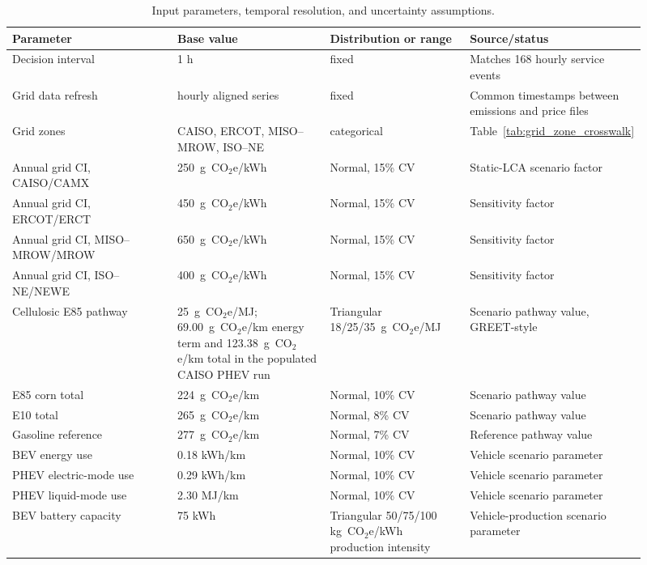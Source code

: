 \documentclass[cleantechnol,article,submit,pdftex,moreauthors]{Definitions/mdpi}
\newcommand{\gcoeqkm}{g~CO$_2$e/km}
\newcommand{\gcoeqkwh}{g~CO$_2$e/kWh}
\newcommand{\gcoeqmj}{g~CO$_2$e/MJ}
\begin{document}
\begin{table}[htbp]
	\centering
	\begin{threeparttable}
		\caption{Input parameters, temporal resolution, and uncertainty assumptions.}
		\label{tab:parameters}
		\scriptsize
		\begin{tabular}{p{0.26\linewidth}p{0.24\linewidth}p{0.22\linewidth}p{0.19\linewidth}}
			\toprule
			Parameter & Base value & Distribution or range & Source/status \\
			\midrule
			Decision interval & 1 h & fixed & Matches 168 hourly service events \\
			Grid data refresh & hourly aligned series & fixed & Common timestamps between emissions and price files \\
			Grid zones & CAISO, ERCOT, MISO--MROW, ISO--NE & categorical & Table~\ref{tab:grid_zone_crosswalk} \\
			Annual grid CI, CAISO/CAMX & 250~\gcoeqkwh{} & Normal, 15\% CV & Static-LCA scenario factor \\
			Annual grid CI, ERCOT/ERCT & 450~\gcoeqkwh{} & Normal, 15\% CV & Sensitivity factor \\
			Annual grid CI, MISO--MROW/MROW & 650~\gcoeqkwh{} & Normal, 15\% CV & Sensitivity factor \\
			Annual grid CI, ISO--NE/NEWE & 400~\gcoeqkwh{} & Normal, 15\% CV & Sensitivity factor \\
			Cellulosic E85 pathway & 25~\gcoeqmj{}; 69.00~\gcoeqkm{} energy term and 123.38~\gcoeqkm{} total in the populated CAISO PHEV run & Triangular 18/25/35~\gcoeqmj{} & Scenario pathway value, GREET-style \\
			E85 corn total & 224~\gcoeqkm{} & Normal, 10\% CV & Scenario pathway value \\
			E10 total & 265~\gcoeqkm{} & Normal, 8\% CV & Scenario pathway value \\
			Gasoline reference & 277~\gcoeqkm{} & Normal, 7\% CV & Reference pathway value \\
			BEV energy use & 0.18 kWh/km & Normal, 10\% CV & Vehicle scenario parameter \\
			PHEV electric-mode use & 0.29 kWh/km & Normal, 10\% CV & Vehicle scenario parameter \\
			PHEV liquid-mode use & 2.30 MJ/km & Normal, 10\% CV & Vehicle scenario parameter \\
			BEV battery capacity & 75 kWh & Triangular 50/75/100 kg~CO$_2$e/kWh production intensity & Vehicle-production scenario parameter \\

\end{tabular}
\end{threeparttable}
\end{table}
\end{document}
